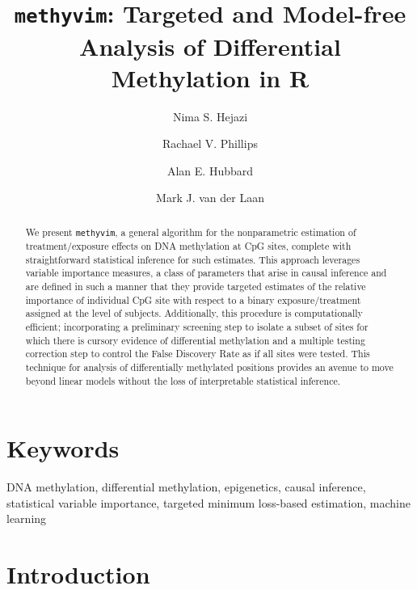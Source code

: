 \documentclass[9pt,a4paper,]{extarticle}
\theoremstyle{definition}
\theoremstyle{definition}
\theoremstyle{definition}
\theoremstyle{remark}
\begin{document}
\pagestyle{front}

\title{\texttt{methyvim}: Targeted and Model-free Analysis of Differential
Methylation in R}

\author[1]{Nima S. Hejazi}
\author[1]{Rachael V. Phillips}
\author[1]{Alan E. Hubbard}
\author[1]{Mark J. van der Laan}

\maketitle
\thispagestyle{front}

\begin{abstract}
We present \texttt{methyvim}, a general algorithm for the nonparametric
estimation of treatment/exposure effects on DNA methylation at CpG
sites, complete with straightforward statistical inference for such
estimates. This approach leverages variable importance measures, a class
of parameters that arise in causal inference and are defined in such a
manner that they provide targeted estimates of the relative importance
of individual CpG site with respect to a binary exposure/treatment
assigned at the level of subjects. Additionally, this procedure is
computationally efficient; incorporating a preliminary screening step to
isolate a subset of sites for which there is cursory evidence of
differential methylation and a multiple testing correction step to
control the False Discovery Rate as if all sites were tested. This
technique for analysis of differentially methylated positions provides
an avenue to move beyond linear models without the loss of interpretable
statistical inference.
\end{abstract}

\section*{Keywords}
DNA methylation, differential methylation, epigenetics, causal
inference, statistical variable importance, targeted minimum loss-based
estimation, machine learning


\clearpage
\pagestyle{main}

\section{Introduction}\label{introduction}
\end{document}
